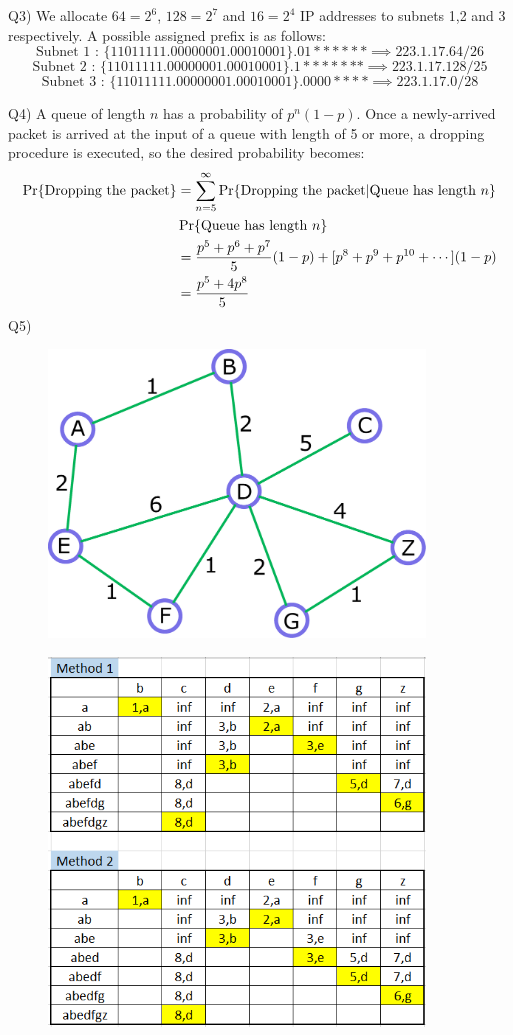 \documentclass[10pt,letterpaper]{article}
\begin{document}
Q3) We allocate $64=2^6$, $128=2^7$ and $16=2^4$ IP addresses to subnets 1,2 and 3 respectively. A possible assigned prefix is as follows:
$$
\text{Subnet 1 : }\{11011111.00000001.00010001\}.01******\implies223.1.17.64/26
$$
$$
\text{Subnet 2 : }\{11011111.00000001.00010001\}.1*******\implies223.1.17.128/25
$$
$$
\text{Subnet 3 : }\{11011111.00000001.00010001\}.0000****\implies223.1.17.0/28
$$

Q4) A queue of length $n$ has a probability of $p^n(1-p)$. Once a newly-arrived packet is arrived at the input of a queue with length of 5 or more, a dropping procedure is executed, so the desired probability becomes:
\[
\begin{split}
\Pr\{\text{Dropping the packet}\}&=
\sum_{n=5}^\infty
\Pr\{\text{Dropping the packet}|\text{Queue has length $n$}\}\\&\Pr\{\text{Queue has length $n$}\}
\\&=
{p^5+p^6+p^7\over 5}(1-p)+[p^8+p^9+p^{10}+\cdots](1-p)
\\&={p^5+4p^8\over 5}
\end{split}
\]
\newpage
Q5)

\begin{figure}[htbp]
\centering
\includegraphics[width=100mm]{dij.eps}
\end{figure}
\begin{figure}[htbp]
\centering
\includegraphics[width=100mm]{dij_tab.png}
\end{figure}
\end{document}
